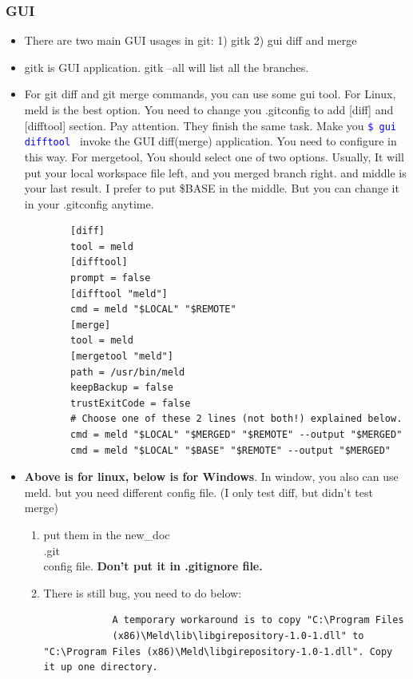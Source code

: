 \documentclass[a4paper,11pt,twoside]{book}
\newcommand{\linuxcommand}[1]{\texttt{\textcolor{blue}{\$ #1 \Pisymbol{psy}{191}}}}
\begin{document}
\subsubsection{GUI}
\begin{itemize}
	\item There are two main GUI usages in git: 1) gitk 2) gui diff and merge    
	
	\item gitk is GUI application. gitk --all will list all the branches.
	
	\item For git diff and git merge commands, you can use some gui tool. For Linux, meld is the best option. You need to change you .gitconfig to add [diff] and [difftool] section. Pay attention. They finish the same task. Make you \linuxcommand{gui difftool} invoke the GUI diff(merge) application. You need to configure in this way. For mergetool, You should select one of two options. Usually, It will put your local workspace file left, and you merged branch right. and middle is your last result. I prefer to put \$BASE in the middle. But you can change it in your .gitconfig anytime. 
	\begin{verbatim}
		[diff]
		tool = meld
		[difftool]
		prompt = false
		[difftool "meld"]
		cmd = meld "$LOCAL" "$REMOTE"
		[merge]
		tool = meld
		[mergetool "meld"]
		path = /usr/bin/meld
		keepBackup = false
		trustExitCode = false	
		# Choose one of these 2 lines (not both!) explained below.
		cmd = meld "$LOCAL" "$MERGED" "$REMOTE" --output "$MERGED"
		cmd = meld "$LOCAL" "$BASE" "$REMOTE" --output "$MERGED"
	\end{verbatim}
	
	\item \textbf{Above is for linux, below is for Windows}. In window, you also can use meld. but you need different config file. (I only test diff, but didn't test merge)
	\begin{enumerate}
		\item put them in the new\_doc\\.git\\config file. \textbf{Don't put it in .gitignore file.}
		\item There is still bug, you need to do below:
		\begin{verbatim}       
			A temporary workaround is to copy "C:\Program Files
			(x86)\Meld\lib\libgirepository-1.0-1.dll" to "C:\Program Files (x86)\Meld\libgirepository-1.0-1.dll". Copy it up one directory.
		\end{verbatim}
		

\end{enumerate}
\end{itemize}
\end{document}
